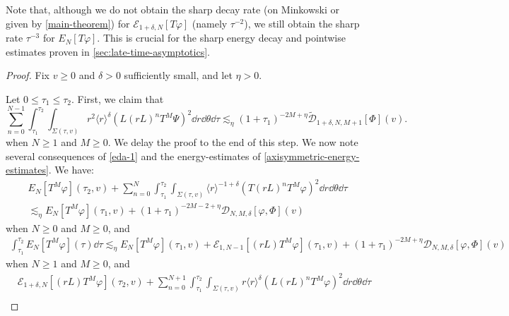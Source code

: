 \documentclass[10pt, reqno]{amsart}
\begin{document}
\begin{remark}
Note that, although we do not obtain the sharp decay rate (on Minkowski or given
by \cref{main-theorem}) for \(\mathcal{E}_{1 + \delta{},N}[T\varphi{}]\) (namely
\(\tau^{-2}\)), we still obtain the sharp rate \(\tau^{-3}\) for
\(E_N[T\varphi{}]\). This is crucial for the sharp energy decay and pointwise
estimates proven in \cref{sec:late-time-asymptotics}.
\end{remark}
\begin{proof}
Fix \(v\ge 0\) and \(\delta{} > 0\) sufficiently small, and let \(\eta{} >0\).

 Let \(0\le \tau_1\le \tau_2\). First, we claim that
\begin{equation}\label{eda-1}
\sum_{n=0}^{N-1}\int_{\tau{}_1}^{\tau{}_2} \int _{\Sigma{}(\tau{},v)}r^2\langle{}r\rangle^\delta{}(L(rL)^nT^M\Psi{})^2\dd{}r\dd{}\theta{}\dd{}\tau{}\lesssim_\eta{} (1+\tau{}_1)^{-2M+\eta{}}\tilde{\mathcal{D}}_{1+\delta{},N,M+1}[\Phi{}](v).
\end{equation}
when \(N\ge 1\) and \(M\ge 0\).
We delay the proof to the end of this step. We now note several consequences of
\cref{eda-1} and the energy-estimates of \cref{axisymmetric-energy-estimates}. We have:
\begin{equation}\label{eda-energy}
\begin{split}
&E_N[T^M\varphi{}](\tau{}_2,v) + \sum_{n=0}^N\int_{\tau{}_1}^{\tau{}_2} \int _{\Sigma{}(\tau{},v)} \langle{}r\rangle^{-1+\delta{}}(T(rL)^nT^M\varphi{})^2\dd{}r\dd{}\theta{}\dd{}\tau{} \\
&\lesssim_\eta{} E_N[T^M\varphi{}](\tau{}_1,v) + (1+\tau{}_1)^{-2M-2+\eta{}}\mathcal{D}_{N,M,\delta{}}[\varphi{},\Phi{}](v)
\end{split}
\end{equation}
when \(N\ge 0\) and \(M\ge 0\), and
\begin{equation}\label{eda-int-energy}
\begin{split}
\int_{\tau{}_1}^{\tau{}_2} E_N[T^M\varphi{}](\tau{})\dd{}\tau{}\lesssim_\eta{} E_N[T^M\varphi{}](\tau{}_1,v) + \mathcal{E}_{1,N-1}[(rL)T^M\varphi{}](\tau{}_1,v) + (1+\tau{}_1)^{-2M+\eta{}}\mathcal{D}_{N,M,\delta{}}[\varphi{},\Phi{}](v)
\end{split}
\end{equation}
when \(N\ge 1\) and \(M\ge 0\), and
\begin{equation}\label{eda-rp-rL}
\begin{split}
&\mathcal{E}_{1+\delta{},N}[(rL)T^M\varphi{}](\tau{}_2,v) + \sum_{n=0}^{N+1}\int_{\tau{}_1}^{\tau{}_2} \int _{\Sigma{}(\tau{},v)} r\langle{}r\rangle^\delta{}(L(rL)^nT^M\varphi{})^2\dd{}r\dd{}\theta{}\dd{}\tau{}\\

\end{split}
\end{equation}
\end{proof}
\end{document}
